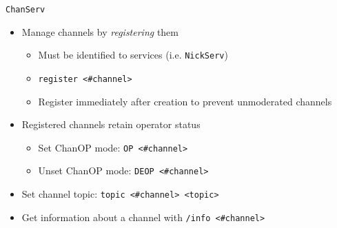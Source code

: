 \documentclass{beamer}
\begin{document}
\begin{frame}{\texttt{ChanServ}}
\begin{itemize}
	\item Manage channels by \emph{registering} them
	\begin{itemize}
		\item Must be identified to services (i.e. \texttt{NickServ})
		\item \texttt{register <\#channel>}
		\item Register immediately after creation to prevent unmoderated channels
	\end{itemize}
	\item Registered channels retain operator status
	\begin{itemize}
		\item Set ChanOP mode: \texttt{OP <\#channel>}
		\item Unset ChanOP mode: \texttt{DEOP <\#channel>}
	\end{itemize}
	\item Set channel topic: \texttt{topic <\#channel> <topic>}
	\item Get information about a channel with \texttt{/info <\#channel>}
\end{itemize}
\end{frame}
\end{document}
